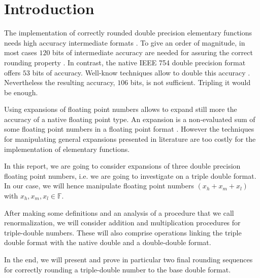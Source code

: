 \documentclass[a4paper,10pt,twoside]{article}
\newcommand{\F}{\ensuremath{\mathbb {F}}}
\newcommand{\hi}{\ensuremath{\mathit{h}}}
\newcommand{\mi}{\ensuremath{\mathit{m}}}
\newcommand{\lo}{\ensuremath{\mathit{l}}}
\begin{document}
\section{Introduction}
The implementation of correctly rounded double precision elementary functions needs high accuracy intermediate
formats \cite{Muller97,Defour-thesis,crlibmweb,DinDefLau2004LIP}. To give an order of magnitude, in most cases
$120$ bits of intermediate accuracy are needed for assuring the correct rounding property \cite{DinDefLau2004LIP}.
In contrast, the native IEEE 754 double precision format offers $53$ bits of accuracy. Well-know techniques
allow to double this accuracy \cite{Dek71}. Nevertheless the resulting accuracy, $106$ bits, is not sufficient.
Tripling it would be enough.\par
Using expansions of floating point numbers allows to expand still more the accuracy of a native floating point type.
An expansion is a non-evaluated sum of some floating point numbers in a floating
point format \cite{Finot-thesis, Pri91, She97}. However the techniques for manipulating general expansions presented
in literature are too costly for the implementation of elementary functions.\par
In this report, we are going to consider expansions of three double
precision floating point numbers, i.e. we are going to investigate on a triple
double format. In our case, we will hence manipulate floating
point numbers $(x_\hi + x_\mi + x_\lo)$ with $x_\hi, x_\mi, x_\lo \in \F$.\par
After making some definitions and an analysis of a procedure that we call
renormalization, we will consider addition and multiplication procedures for
triple-double numbers. These will also comprise operations linking the triple
double format with the native double and a double-double format.\par
In the end,
we will present and prove in particular two final rounding sequences for correctly
rounding a triple-double number to the base double format.
\end{document}
